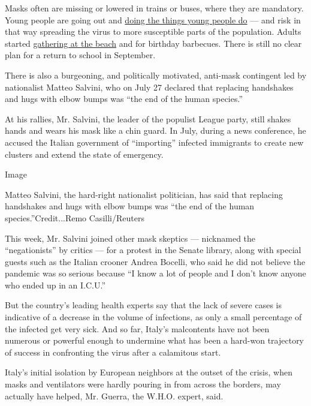 Masks often are missing or lowered in trains or buses, where they are
mandatory. Young people are going out and
\href{https://www.nytimes3xbfgragh.onion/2020/05/29/world/europe/italy-young-people-coronavirus.html}{doing
the things young people do} --- and risk in that way spreading the virus
to more susceptible parts of the population. Adults started
\href{https://www.nytimes3xbfgragh.onion/2020/05/27/world/europe/italy-beaches-coronavirus-reopening.html}{gathering
at the beach} and for birthday barbecues. There is still no clear plan
for a return to school in September.

There is also a burgeoning, and politically motivated, anti-mask
contingent led by nationalist Matteo Salvini, who on July 27 declared
that replacing handshakes and hugs with elbow bumps was ``the end of the
human species.''

At his rallies, Mr. Salvini, the leader of the populist League party,
still shakes hands and wears his mask like a chin guard. In July, during
a news conference, he accused the Italian government of ``importing''
infected immigrants to create new clusters and extend the state of
emergency.

Image

Matteo Salvini, the hard-right nationalist politician, has said that
replacing handshakes and hugs with elbow bumps was ``the end of the
human species.''Credit...Remo Casilli/Reuters

This week, Mr. Salvini joined other mask skeptics --- nicknamed the
``negationists'' by critics --- for a protest in the Senate library,
along with special guests such as the Italian crooner Andrea Bocelli,
who said he did not believe the pandemic was so serious because ``I know
a lot of people and I don't know anyone who ended up in an I.C.U.''

But the country's leading health experts say that the lack of severe
cases is indicative of a decrease in the volume of infections, as only a
small percentage of the infected get very sick. And so far, Italy's
malcontents have not been numerous or powerful enough to undermine what
has been a hard-won trajectory of success in confronting the virus after
a calamitous start.

Italy's initial isolation by European neighbors at the outset of the
crisis, when masks and ventilators were hardly pouring in from across
the borders, may actually have helped, Mr. Guerra, the W.H.O. expert,
said.

\href{https://www.nytimes3xbfgragh.onion/news-event/coronavirus?action=click\&pgtype=Article\&state=default\&region=MAIN_CONTENT_3\&context=storylines_faq}{}

